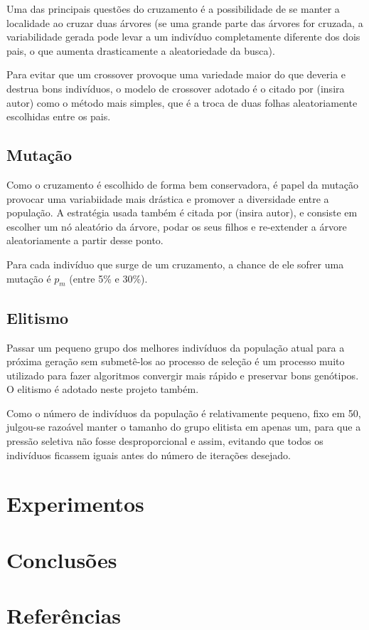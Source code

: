 \documentclass[11pt]{article}
\begin{document}
Uma das principais questões do cruzamento é a possibilidade de se manter a localidade ao cruzar duas árvores (se uma grande parte das árvores for cruzada, a variabilidade gerada pode levar a um indivíduo completamente diferente dos dois pais, o que aumenta drasticamente a aleatoriedade da busca).

Para evitar que um crossover provoque uma variedade maior do que deveria e destrua bons indivíduos, o modelo de crossover adotado é o citado por (insira autor) como o método mais simples, que é a troca de duas folhas aleatoriamente escolhidas entre os pais.

\subsection*{Mutação}

Como o cruzamento é escolhido de forma bem conservadora, é papel da mutação provocar uma variabiidade mais drástica e promover a diversidade entre a população. A estratégia usada também é citada por (insira autor), e consiste em escolher um nó aleatório da árvore, podar os seus filhos e re-extender a árvore aleatoriamente a partir desse ponto.

Para cada indivíduo que surge de um cruzamento, a chance de ele sofrer uma mutação é $p_m$ (entre 5\% e 30\%).

\subsection*{Elitismo}

Passar um pequeno grupo dos melhores indivíduos da população atual para a próxima geração sem submetê-los ao processo de seleção é um processo muito utilizado para fazer algoritmos convergir mais rápido e preservar bons genótipos. O elitismo é adotado neste projeto também.

Como o número de indivíduos da população é relativamente pequeno, fixo em 50, julgou-se razoável manter o tamanho do grupo elitista em apenas um, para que a pressão seletiva não fosse desproporcional e assim, evitando que todos os indivíduos ficassem iguais antes do número de iterações desejado.

\section{Experimentos}

\section{Conclusões}

\section{Referências}
\end{document}
